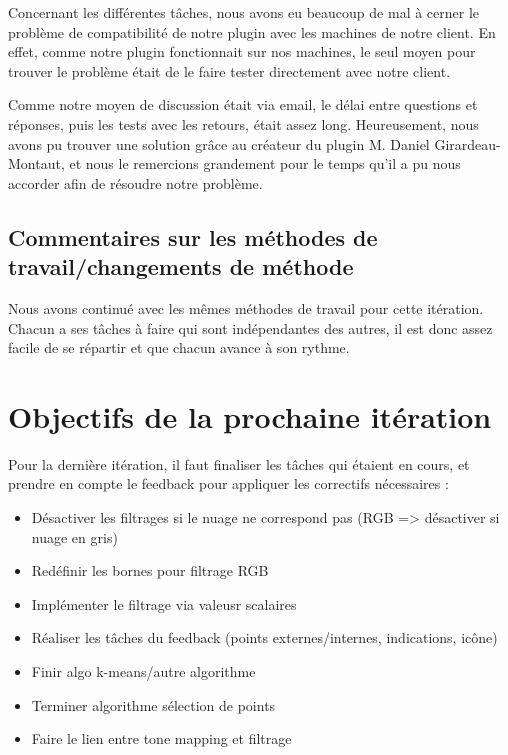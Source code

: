 \documentclass[12pt,titlepage,french]{article}
\begin{document}
Concernant les différentes tâches, nous avons eu beaucoup de mal à cerner le problème de compatibilité de notre plugin avec les machines de notre client. En effet, comme notre plugin fonctionnait sur nos machines, le seul moyen pour trouver le problème était de le faire tester directement avec notre client. \newline

Comme notre moyen de discussion était via email, le délai entre questions et réponses, puis les tests avec les retours, était assez long. Heureusement, nous avons pu trouver une solution grâce au créateur du plugin M. Daniel Girardeau-Montaut, et nous le remercions grandement pour le temps qu'il a pu nous accorder afin de résoudre notre problème.

\subsection{Commentaires sur les méthodes de travail/changements de méthode}

Nous avons continué avec les mêmes méthodes de travail pour cette itération. Chacun a ses tâches à faire qui sont indépendantes des autres, il est donc assez facile de se répartir et que chacun avance à son rythme.

\section{Objectifs de la prochaine itération}

Pour la dernière itération, il faut finaliser les tâches qui étaient en cours, et prendre en compte le feedback pour appliquer les correctifs nécessaires :

\begin{itemize}
    \item Désactiver les filtrages si le nuage ne correspond pas (RGB => désactiver si nuage en gris)
    \item Redéfinir les bornes pour filtrage RGB
    \item Implémenter le filtrage via valeusr scalaires
    \item Réaliser les tâches du feedback (points externes/internes, indications, icône)
    \item Finir algo k-means/autre algorithme
    \item Terminer algorithme sélection de points
    \item Faire le lien entre tone mapping et filtrage
\end{itemize}

\begin{thebibliography}{3}

\end{thebibliography}
\end{document}
